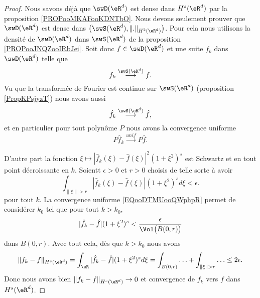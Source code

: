 \begin{proof}
    Nous savons déjà que \( \swD(\eR^d)\) est dense dans \( H^s(\eR^d)\) par la proposition \ref{PROPooMKAFooKDNTbO}. Nous devons seulement prouver que \( \swD(\eR^d)\) est dense dans \( \big( \swS(\eR^d),\| . \|_{H^2(\eR^d)} \big)\). Pour cela nous utilisons la densité de \( \swD(\eR^d)\) dans \( \swS(\eR^d)\) de la proposition \ref{PROPooJNQZooIRbJei}. Soit donc \( f\in\swD(\eR^d)\) et une suite \( f_k\) dans \( \swD(\eR^d)\) telle que
    \begin{equation}
        f_k\stackrel{\swS(\eR^d)}{\longrightarrow}f.
    \end{equation}
    Vu que la transformée de Fourier est continue sur \( \swS(\eR^d)\) (proposition \ref{PropKPsjyzT}) nous avons aussi
    \begin{equation}
        \hat f_k\stackrel{\swS(\eR^d)}{\longrightarrow}\hat f,
    \end{equation}
    et en particulier pour tout polynôme \( P\) nous avons la convergence uniforme
    \begin{equation}        \label{EQooDTMUooQWphpR}
        P\hat f_k\stackrel{unif}{\longrightarrow}P\hat f.
    \end{equation}

    D'autre part la fonction \( \xi\mapsto | \hat f_k(\xi)-\hat f(\xi) |^2(1+\xi^2)^s\) est Schwartz et en tout point décroissante en \( k\). Soientt \( \epsilon>0\) et \( r>0\) choisis de telle sorte à avoir
    \begin{equation}
        \int_{\| \xi \|>r}| \hat f_{k}(\xi)-\hat f(\xi) |(1+\xi^2)^sd\xi<\epsilon.
    \end{equation}
    pour tout \( k\). La convergence uniforme \eqref{EQooDTMUooQWphpR} permet de considérer \( k_0\) tel que  pour tout \( k>k_0\),
    \begin{equation}
        | \hat f_k-\hat f |(1+\xi^2)^s< \frac{ \epsilon }{ \Vol\big( B(0,r) \big) }
    \end{equation}
    dans \( B(0,r)\). Avec tout cela, dès que \( k>k_0\) nous avons
    \begin{equation}
        \| f_k-f \|_{H^s(\eR^d)}=\int_{\eR}| \hat f_k-\hat f |(1+\xi^2)^sd\xi=\int_{B(0,r)}\ldots +\int_{\| \xi \|>r}\ldots\leq 2\epsilon.
    \end{equation}
    Donc nous avons bien \( \| f_k-f \|_{H^s(\eR^d)}\to 0\) et convergence de \( f_k\) vers \( f\) dans \( H^s(\eR^d)\).
\end{proof}

